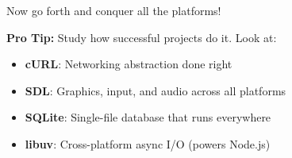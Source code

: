 Now go forth and conquer all the platforms!

\begin{tipbox}
\textbf{Pro Tip:} Study how successful projects do it. Look at:
\begin{itemize}
    \item \textbf{cURL}: Networking abstraction done right
    \item \textbf{SDL}: Graphics, input, and audio across all platforms
    \item \textbf{SQLite}: Single-file database that runs everywhere
    \item \textbf{libuv}: Cross-platform async I/O (powers Node.js)
\end{itemize}
\end{tipbox}
